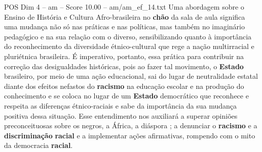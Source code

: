 \begin{textsample}{POS Dim 4 – am – Score 10.00 – am/am\_ef\_14.txt}
Uma abordagem sobre o Ensino de História e Cultura Afro-brasileira no \textbf{chão} da sala de aula significa uma mudança não só nas práticas e nas políticas, mas também no imaginário pedagógico e na sua relação com o diverso, sensibilizando quanto à importância do reconhecimento da diversidade étnico-cultural que rege a nação multirracial e pluriétnica brasileira.
É imperativo, portanto, essa prática para contribuir na correção das desigualdades históricas, pois ao fazer tal movimento, o \textbf{Estado} brasileiro, por meio de uma ação educacional, sai do lugar de neutralidade estatal diante dos efeitos nefastos do \textbf{racismo} na educação escolar e na produção do conhecimento e se coloca no lugar de um \textbf{Estado} democrático que reconhece e respeita as diferenças étnico-raciais e sabe da importância da sua mudança positiva dessa situação.
Esse entendimento nos auxiliará a superar opiniões preconceituosas sobre os negros, a África, a diáspora ; a denunciar o \textbf{racismo} e a \textbf{discriminação} \textbf{racial} e a implementar ações afirmativas, rompendo com o mito da democracia \textbf{racial}.

\end{textsample}
